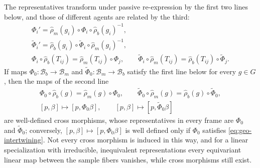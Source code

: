 The representatives transform under passive re-expression by the first two lines below, and those of
different agents are related by the third:
\begin{gather}
\Phi_i'=\widehat\rho_m(g_i)\circ\Phi_i\circ\widehat\rho_b(g_i)^{-1},
\label{eq:geo-phi-gauge-law}\\
\widetilde\Phi_i'=\widehat\rho_b(g_i)\circ\widetilde\Phi_i\circ\widehat\rho_m(g_i)^{-1},
\label{eq:geo-tildephi-gauge-law}\\
\Phi_i\circ\widehat\rho_b(T_{ij})=\widehat\rho_m(T_{ij})\circ\Phi_j,
\qquad
\widetilde\Phi_i\circ\widehat\rho_m(T_{ij})=\widehat\rho_b(T_{ij})\circ\widetilde\Phi_j.
\label{eq:geo-cross-map-gluing}
\end{gather}
If maps $\Phi_0:\mathcal B_b\to\mathcal B_m$ and $\widetilde\Phi_0:\mathcal B_m\to\mathcal B_b$
satisfy the first line below for every $g\in G$, then the maps of the second line
\begin{gather}
\Phi_0\circ\widehat\rho_b(g)=\widehat\rho_m(g)\circ\Phi_0,
\qquad
\widetilde\Phi_0\circ\widehat\rho_m(g)=\widehat\rho_b(g)\circ\widetilde\Phi_0,
\label{eq:geo-intertwining}\\
[p,\beta]\longmapsto[p,\Phi_0\beta],
\qquad
[p,\beta]\longmapsto[p,\widetilde\Phi_0\beta]
\label{eq:geo-induced-cross-morphisms}
\end{gather}
are well-defined cross morphisms, whose representatives in every frame are $\Phi_0$ and
$\widetilde\Phi_0$; conversely, $[p,\beta]\mapsto[p,\Phi_0\beta]$ is well defined only if $\Phi_0$
satisfies \eqref{eq:geo-intertwining}. Not every cross morphism is induced in this way, and for a
linear specialization with irreducible, inequivalent representations every equivariant linear map
between the sample fibers vanishes, while cross morphisms still exist. 

